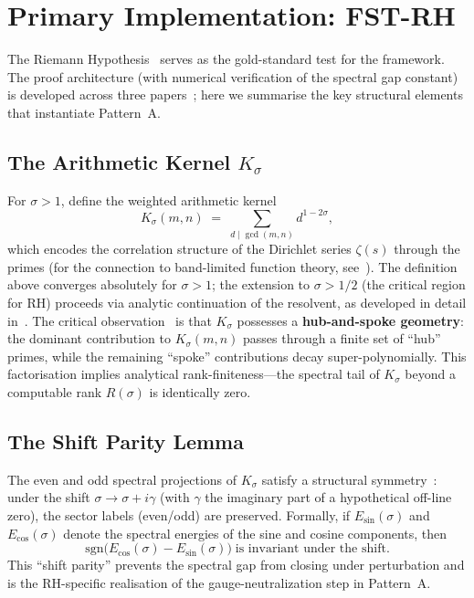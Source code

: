 \documentclass[12pt,a4paper]{article}
\theoremstyle{definition}
\theoremstyle{remark}
\begin{document}
\section{Primary Implementation: FST-RH}
\label{sec:fst-rh}

The Riemann Hypothesis~\cite{Bombieri2000} serves as the gold-standard test for the framework. The proof architecture (with numerical verification of the spectral gap constant) is developed across three papers~\cite{Geiger2026a,Geiger2026b,Geiger2026c}; here we summarise the key structural elements that instantiate Pattern~A.

\subsection{The Arithmetic Kernel $K_\sigma$}

For $\sigma > 1$, define the weighted arithmetic kernel
\[
K_\sigma(m,n) \;=\; \sum_{d \mid \gcd(m,n)} d^{1-2\sigma},
\]
which encodes the correlation structure of the Dirichlet series $\zeta(s)$ through the primes (for the connection to band-limited function theory, see~\cite{SlepianPollak1961}). The definition above converges absolutely for $\sigma > 1$; the extension to $\sigma > 1/2$ (the critical region for RH) proceeds via analytic continuation of the resolvent, as developed in detail in~\cite{Geiger2026a}. The critical observation~\cite{Geiger2026a} is that $K_\sigma$ possesses a \textbf{hub-and-spoke geometry}: the dominant contribution to $K_\sigma(m,n)$ passes through a finite set of ``hub'' primes, while the remaining ``spoke'' contributions decay super-polynomially. This factorisation implies analytical rank-finiteness---the spectral tail of $K_\sigma$ beyond a computable rank $R(\sigma)$ is identically zero.

\subsection{The Shift Parity Lemma}

The even and odd spectral projections of $K_\sigma$ satisfy a structural symmetry~\cite{Geiger2026b}: under the shift $\sigma \to \sigma + i\gamma$ (with $\gamma$ the imaginary part of a hypothetical off-line zero), the sector labels (even/odd) are preserved. Formally, if $E_{\sin}(\sigma)$ and $E_{\cos}(\sigma)$ denote the spectral energies of the sine and cosine components, then
\[
\text{sgn}\bigl(E_{\cos}(\sigma) - E_{\sin}(\sigma)\bigr) \;\text{is invariant under the shift.}
\]
This ``shift parity'' prevents the spectral gap from closing under perturbation and is the RH-specific realisation of the gauge-neutralization step in Pattern~A.
\end{document}
